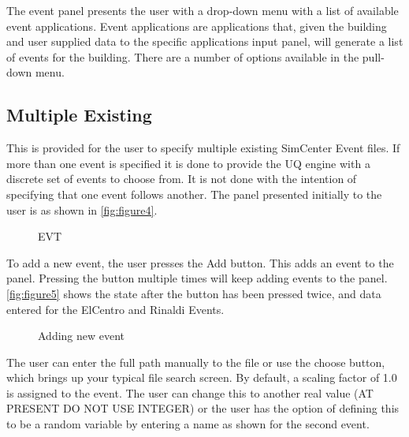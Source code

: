 The event panel presents the user with a drop-down menu with a list of available event applications. Event applications are applications that, given the building and user supplied data to the specific
applications input panel, will generate a list of events for the building. There are a number of options available in the pull-down menu.


\subsection{Multiple Existing}

This is provided for the user to specify multiple existing SimCenter
Event files.  If more than one event is specified it is done to provide
the UQ engine with a discrete set of events to choose from.  It is not
done with the intention of specifying that one event follows another.
The panel presented initially to the user is as shown
in \autoref{fig:figure4}.

\begin{figure}[!htbp]
  \caption{EVT}
  \label{fig:figure4}
\end{figure}

To add a new event, the user presses the Add button.  This adds an event to the panel.  Pressing the button multiple times will keep adding events to the panel.  \autoref{fig:figure5} shows the state after the button has been pressed twice, and data entered for the ElCentro and Rinaldi Events.

\begin{figure}[!htbp]
  \caption{Adding new event}
  \label{fig:figure5}
\end{figure}


The user can enter the full path manually to the file or use the choose button,  which brings up your typical file search screen.  By default, a scaling factor of 1.0 is assigned to the event. 
The user can change this to another real value (AT PRESENT DO NOT USE INTEGER) or the user 
has the option of defining this to be a random variable by entering a name as shown for the second event. 

